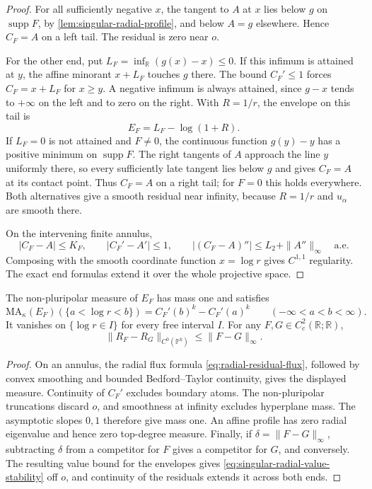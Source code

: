 \begin{proof}
For all sufficiently negative $x$, the tangent to $A$ at $x$ lies below $g$ on $\operatorname{supp}F$, by \cref{lem:singular-radial-profile}, and below $A=g$ elsewhere. Hence $C_F=A$ on a left tail. The residual is zero near $o$.

For the other end, put $L_F=\inf_{\mathbb R}(g(x)-x)\leq0$. If this infimum is attained at $y$, the affine minorant $x+L_F$ touches $g$ there. The bound $C_F'\leq1$ forces $C_F=x+L_F$ for $x\geq y$. A negative infimum is always attained, since $g-x$ tends to $+\infty$ on the left and to zero on the right. With $R=1/r$, the envelope on this tail is
\begin{equation}\label{eq:singular-radial-infinity-tail}
 E_F=L_F-\log(1+R).
\end{equation}
If $L_F=0$ is not attained and $F\ne0$, the continuous function $g(y)-y$ has a positive minimum on $\operatorname{supp}F$. The right tangents of $A$ approach the line $y$ uniformly there, so every sufficiently late tangent lies below $g$ and gives $C_F=A$ at its contact point. Thus $C_F=A$ on a right tail; for $F=0$ this holds everywhere. Both alternatives give a smooth residual near infinity, because $R=1/r$ and $u_\alpha$ are smooth there.

On the intervening finite annulus,
\[
 |C_F-A|\leq K_F,\qquad |C_F'-A'|\leq1,
 \qquad |(C_F-A)''|\leq L_2+\|A''\|_\infty
 \quad\text{a.e.}
\]
Composing with the smooth coordinate function $x=\log r$ gives $C^{1,1}$ regularity. The exact end formulas extend it over the whole projective space.
\end{proof}

\begin{corollary}\label{cor:singular-radial-envelope-mass}
The non-pluripolar measure of $E_F$ has mass one and satisfies
\[
 \mathrm{MA}_\kappa(E_F)(\{a<\log r<b\})=C_F'(b)^k-C_F'(a)^k
 \qquad(-\infty<a<b<\infty).
\]
It vanishes on $\{\log r\in I\}$ for every free interval $I$. For any $F,G\in C_c^2(\mathbb R;\mathbb R)$,
\begin{equation}\label{eq:singular-radial-value-stability}
 \|R_F-R_G\|_{C^0(\mathbb P^k)}\leq\|F-G\|_\infty.
\end{equation}
\end{corollary}
\begin{proof}
On an annulus, the radial flux formula \eqref{eq:radial-residual-flux}, followed by convex smoothing and bounded Bedford--Taylor continuity, gives the displayed measure. Continuity of $C_F'$ excludes boundary atoms. The non-pluripolar truncations discard $o$, and smoothness at infinity excludes hyperplane mass. The asymptotic slopes $0,1$ therefore give mass one. An affine profile has zero radial eigenvalue and hence zero top-degree measure. Finally, if $\delta=\|F-G\|_\infty$, subtracting $\delta$ from a competitor for $F$ gives a competitor for $G$, and conversely. The resulting value bound for the envelopes gives \eqref{eq:singular-radial-value-stability} off $o$, and continuity of the residuals extends it across both ends.
\end{proof}

